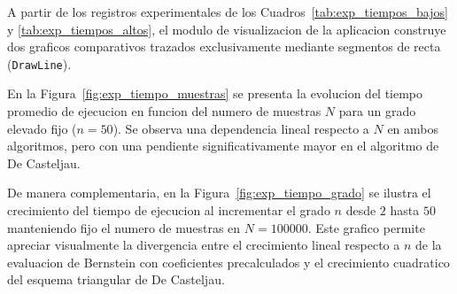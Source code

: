 A partir de los registros experimentales de los Cuadros~\ref{tab:exp_tiempos_bajos} y \ref{tab:exp_tiempos_altos}, el modulo de visualizacion de la aplicacion construye dos graficos comparativos trazados exclusivamente mediante segmentos de recta (\texttt{DrawLine}).

En la Figura~\ref{fig:exp_tiempo_muestras} se presenta la evolucion del tiempo promedio de ejecucion en funcion del numero de muestras $N$ para un grado elevado fijo ($n = 50$). Se observa una dependencia lineal respecto a $N$ en ambos algoritmos, pero con una pendiente significativamente mayor en el algoritmo de De Casteljau.


De manera complementaria, en la Figura~\ref{fig:exp_tiempo_grado} se ilustra el crecimiento del tiempo de ejecucion al incrementar el grado $n$ desde $2$ hasta $50$ manteniendo fijo el numero de muestras en $N = 100000$. Este grafico permite apreciar visualmente la divergencia entre el crecimiento lineal respecto a $n$ de la evaluacion de Bernstein con coeficientes precalculados y el crecimiento cuadratico del esquema triangular de De Casteljau.


